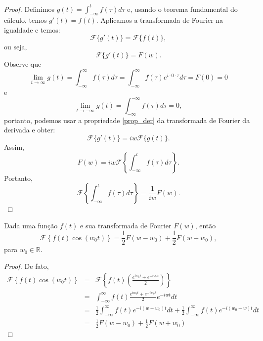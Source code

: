 \begin{proof}
Definimos $g(t)=\int_{-\infty}^t f(\tau)d\tau$ e, usando o teorema fundamental do cálculo, temos $g'(t)=f(t)$. Aplicamos a transformada de Fourier na igualdade e temos:
\begin{equation}
\mathcal{F}\{g'(t)\}=\mathcal{F}\{f(t)\},
\end{equation}
ou seja,
\begin{equation}
\mathcal{F}\{g'(t)\}=F(w).
\end{equation}
Observe que
\begin{equation}
\lim_{t\to\infty} g(t)=\int_{-\infty}^\infty f(\tau)d\tau=\int_{-\infty}^\infty f(\tau)e^{i\cdot 0 \cdot \tau}d\tau=F(0)=0
\end{equation}
e
\begin{equation}
\lim_{t\to-\infty} g(t)=\int_{-\infty}^{-\infty} f(\tau)d\tau=0,
\end{equation}
portanto, podemos usar a propriedade \ref{prop_der} da transformada de Fourier da derivada e obter:
\begin{equation}
\mathcal{F}\{g'(t)\}=iw \mathcal{F}\{g(t)\}.
\end{equation}
Assim,
\begin{equation}
F(w)=iw \mathcal{F}\left\{\int_{-\infty}^t f(\tau)d\tau\right\}.
\end{equation}
Portanto,
\begin{equation}
\mathcal{F}\left\{\int_{-\infty}^t f(\tau)d\tau\right\}=\frac{1}{iw}F(w).
\end{equation}
\end{proof}
\begin{teo}\label{prop_mod}  Dada uma função $f(t)$ e sua transformada de Fourier $F(w)$, então
\begin{equation}
\mathcal{F}\left\{f(t)\cos(w_0t) \right\}=\frac{1}{2}F(w-w_0)+\frac{1}{2}F(w+w_0),
\end{equation}
para $w_0\in\mathbb{R}$.
\end{teo}
\begin{proof}
De fato,
\begin{eqnarray*}
\mathcal{F}\left\{f(t)\cos(w_0t) \right\}&=&\mathcal{F}\left\{f(t)\left(\frac{e^{iw_0t}+e^{-iw_0t}}{2} \right)\right\} \\
&=&\int_{-\infty}^\infty f(t)\frac{e^{iw_0t}+e^{-iw_0t}}{2}e^{-iwt}dt  \\
&=&\frac{1}{2}\int_{-\infty}^\infty f(t)e^{-i(w-w_0)t}dt+\frac{1}{2}  \int_{-\infty}^\infty f(t)e^{-i(w_0+w)t}dt\\
&=&\frac{1}{2}F(w-w_0)+\frac{1}{2}F(w+w_0)
\end{eqnarray*}
\end{proof}
